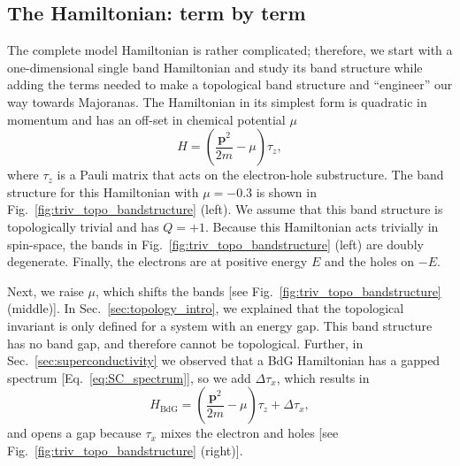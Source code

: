 \subsection{The Hamiltonian: term by term}\label{sec:hamiltonian_term_by_term}
The complete model Hamiltonian is rather complicated; therefore, we start with a one-dimensional single band Hamiltonian and study its band structure while adding the terms needed to make a topological band structure and ``engineer'' our way towards Majoranas.
The Hamiltonian in its simplest form is quadratic in momentum and has an off-set in chemical potential $\mu$
\begin{equation}
H=\left(\frac{\bm{p}^{2}}{2m}-\mu\right)\tau_{z},\label{eq:simple_ham}
\end{equation}
where $\tau_{z}$ is a Pauli matrix that acts on the electron-hole substructure.
The band structure for this Hamiltonian with $\mu=-0.3$ is shown in Fig.~\ref{fig:triv_topo_bandstructure} (left).
We assume that this band structure is topologically trivial and has $Q=+1$.
Because this Hamiltonian acts trivially in spin-space, the bands in Fig.~\ref{fig:triv_topo_bandstructure} (left) are doubly degenerate.
Finally, the electrons are at positive energy $E$ and the holes on $-E$.

Next, we raise $\mu$, which shifts the bands [see Fig.~\ref{fig:triv_topo_bandstructure} (middle)].
In Sec.~\ref{sec:topology_intro}, we explained that the topological invariant is only defined for a system with an energy gap.
This band structure has no band gap, and therefore cannot be topological.
Further, in Sec.~\ref{sec:superconductivity} we observed that a BdG Hamiltonian has a gapped spectrum [Eq.~\eqref{eq:SC_spectrum}], so we add $\Delta\tau_{x}$, which results in
\begin{equation}
H_{\textrm{BdG}}=\left(\frac{\bm{p}^{2}}{2m}-\mu\right)\tau_{z}+\Delta\tau_{x},
\end{equation}
and opens a gap because $\tau_{x}$ mixes the electron and holes [see Fig.~\ref{fig:triv_topo_bandstructure} (right)].

